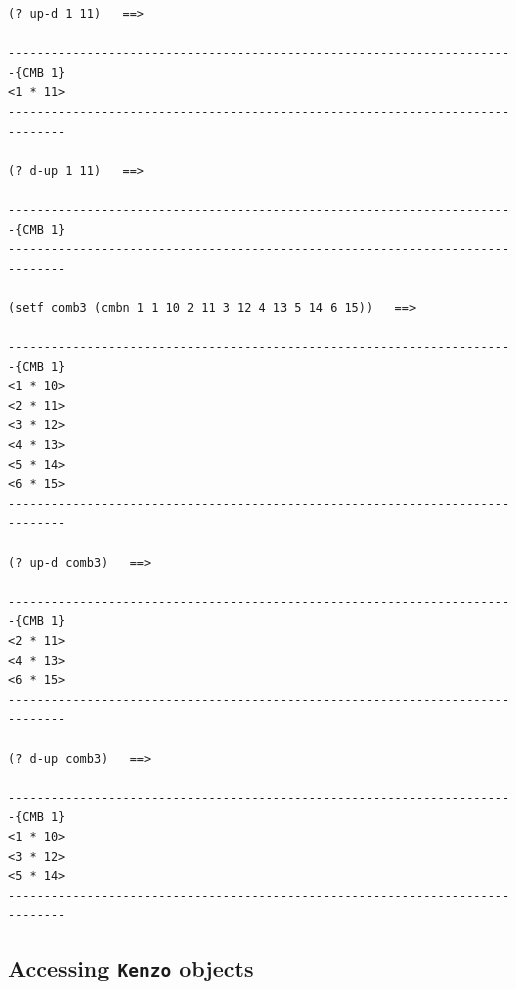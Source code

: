{\footnotesize\begin{verbatim}
(? up-d 1 11)   ==>

-----------------------------------------------------------------------{CMB 1}
<1 * 11>
------------------------------------------------------------------------------

(? d-up 1 11)   ==>

-----------------------------------------------------------------------{CMB 1}
------------------------------------------------------------------------------

(setf comb3 (cmbn 1 1 10 2 11 3 12 4 13 5 14 6 15))   ==>

-----------------------------------------------------------------------{CMB 1}
<1 * 10>
<2 * 11>
<3 * 12>
<4 * 13>
<5 * 14>
<6 * 15>
------------------------------------------------------------------------------

(? up-d comb3)   ==>

-----------------------------------------------------------------------{CMB 1}
<2 * 11>
<4 * 13>
<6 * 15>
------------------------------------------------------------------------------

(? d-up comb3)   ==>

-----------------------------------------------------------------------{CMB 1}
<1 * 10>
<3 * 12>
<5 * 14>
------------------------------------------------------------------------------
\end{verbatim}}

\newpage

\subsection {Accessing {\tt Kenzo} objects}

